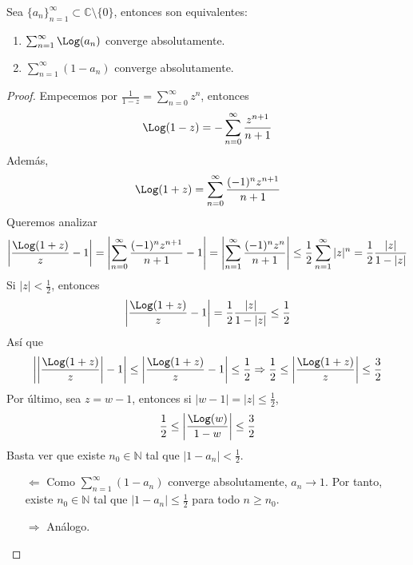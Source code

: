 \begin{lemma}
    Sea $\{a_n\}_{n=1}^\infty \subset \mathbb{C} \setminus \{0\}$, entonces son equivalentes:
    \begin{enumerate}
        \item $\sum_{n=1}^\infty \Log(a_n)$ converge absolutamente.
        \item $\sum_{n=1}^\infty (1-a_n)$ converge absolutamente.
    \end{enumerate}
\end{lemma}

\begin{proof}
    Empecemos por $\frac{1}{1-z} = \sum_{n=0}^\infty z^n$, entonces
    $$\Log(1-z) = -\sum_{n=0}^\infty \frac{z^{n+1}}{n+1}$$
    Además,
    $$\Log(1+z) = \sum_{n=0}^\infty \frac{(-1)^nz^{n+1}}{n+1}$$
    Queremos analizar
    $$\left|\frac{\Log(1+z)}{z} - 1\right| = \left|\sum_{n=0}^\infty \frac{(-1)^nz^{n+1}}{n+1} - 1\right| = \left|\sum_{n=1}^\infty \frac{(-1)^nz^n}{n+1}\right| \leq \frac{1}{2}\sum_{n=1}^\infty |z|^n = \frac{1}{2}\frac{|z|}{1-|z|}$$
    Si $|z| < \frac{1}{2}$, entonces
    $$\left|\frac{\Log(1+z)}{z} - 1\right| = \frac{1}{2}\frac{|z|}{1-|z|} \leq \frac{1}{2}$$
    Así que
    $$\left|\left|\frac{\Log(1+z)}{z}\right| - 1\right| \leq \left|\frac{\Log(1+z)}{z} - 1\right| \leq \frac{1}{2} \Rightarrow \frac{1}{2} \leq \left|\frac{\Log(1+z)}{z}\right| \leq \frac{3}{2}$$
    Por último, sea $z = w-1$, entonces si $|w-1| = |z| \leq \frac{1}{2}$,
    $$\frac{1}{2} \leq \left|\frac{\Log(w)}{1-w}\right| \leq \frac{3}{2}$$
    Basta ver que existe $n_0 \in \mathbb{N}$ tal que $|1-a_n| < \frac{1}{2}$.
    \begin{itemize}
        \item[$\Leftarrow$] Como $\sum_{n=1}^\infty (1-a_n)$ converge absolutamente, $a_n \to 1$.
            Por tanto, existe $n_0 \in \mathbb{N}$ tal que $|1-a_n| \leq \frac{1}{2}$ para todo $n \geq n_0$.
        \item[$\Rightarrow$] Análogo.
    \end{itemize}
\end{proof}

